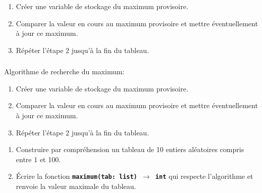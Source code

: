 \documentclass[svgnames,11pt]{beamer}
\begin{document}
\begin{frame}
    \frametitle{}

    \begin{center}
    \end{center}
    \begin{enumerate}
        \item Créer une variable de stockage du maximum provisoire.
        \item Comparer la valeur en cours au maximum provisoire et mettre éventuellement à jour ce maximum.
        \item Répéter l'étape 2 jusqu'à la fin du tableau.
    \end{enumerate}
\end{frame}
\begin{frame}
    \frametitle{}
    Algorithme de recherche du maximum:
    \begin{enumerate}
        \item Créer une variable de stockage du maximum provisoire.
        \item Comparer la valeur en cours au maximum provisoire et mettre éventuellement à jour ce maximum.
        \item Répéter l'étape 2 jusqu'à la fin du tableau.
    \end{enumerate}
    \begin{activite}
        \begin{enumerate}
            \item Construire par compréhension un tableau de 10 entiers aléatoires compris entre 1 et 100.
            \item Écrire la fonction \textbf{\texttt{maximum(tab: list) $\rightarrow$ int}} qui respecte l'algorithme et renvoie la valeur maximale du tableau.
        \end{enumerate}
    \end{activite}

\end{frame}
\end{document}
